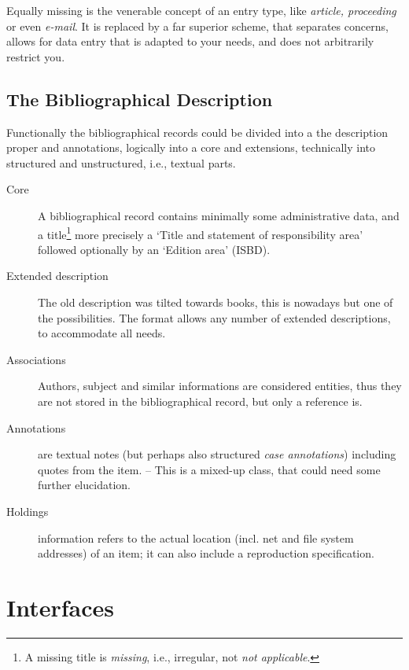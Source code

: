 Equally missing is the venerable concept of an entry type, like
\textit{article, proceeding} or even \textit{e-mail}.  It is replaced
by a far superior scheme, that separates concerns, allows for data
entry that is adapted to your needs, and does not arbitrarily restrict
you. 

\subsection{The Bibliographical Description}
\label{sec:rgconcbiblio}

Functionally the bibliographical records could be divided into a
the description proper and annotations, logically into a core and
extensions, technically into structured and unstructured, i.e.,
textual parts.

\begin{description}
\item[Core] A bibliographical record contains minimally some
  administrative data, and a title\footnote {A missing title is
    \textit{missing}, i.e., irregular, not \textit{not applicable}.}
  more precisely a `Title and statement of responsibility area'
  followed optionally by an `Edition area' (ISBD).
  
\item[Extended description] The old description was tilted towards
  books, this is nowadays but one of the possibilities. The format
  allows any number of extended descriptions, to accommodate all
  needs. 
\item[Associations] Authors, subject and similar informations are
  considered entities, thus they are not stored in the bibliographical
  record, but only a reference is.

\item[Annotations] are textual notes (but perhaps also structured
  \textit{case annotations}) including quotes from the item. -- This
  is a mixed-up class, that could need some further elucidation.


\item[Holdings] information refers to the actual location (incl. net
  and file system addresses) of an item; it can also include a
  reproduction specification.
\end{description}



\section{Interfaces}
\label{sec:rgcintf}

